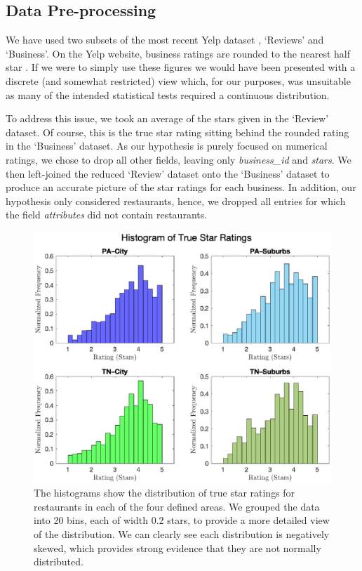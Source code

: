 \documentclass{article}
\begin{document}
\subsection{Data Pre-processing}
We have used two subsets of the most recent Yelp dataset \cite{yelp_academic_dataset}, `Reviews' and `Business'. On the Yelp website, business ratings are rounded to the nearest half star \cite{luca2016reviews}. If we were to simply use these figures we would have been presented with a discrete (and somewhat restricted) view which, for our purposes, was unsuitable as many of the intended statistical tests required a continuous distribution. \par

To address this issue, we took an average of the stars given in the `Review' dataset. Of course, this is the true star rating sitting behind the rounded rating in the `Business' dataset. As our hypothesis is purely focused on numerical ratings, we chose to drop all other fields, leaving only \textit{business\_id} and \textit{stars}. We then left-joined the reduced `Review' dataset onto the `Business' dataset to produce an accurate picture of the star ratings for each business. In addition, our hypothesis only considered restaurants, hence, we dropped all entries for which the field \textit{attributes} did not contain restaurants. \par

\begin{figure}[ht]
    \centering
    \includegraphics[trim={0 0 0 1cm},clip,width=\textwidth]{Histogram.eps}
    \caption{The histograms show the distribution of true star ratings for restaurants in each of the four defined areas. We grouped the data into 20 bins, each of width 0.2 stars, to provide a more detailed view of the distribution. We can clearly see each distribution is negatively skewed, which provides strong evidence that they are not normally distributed.}
    \label{fig:1}
\end{figure}
\end{document}

